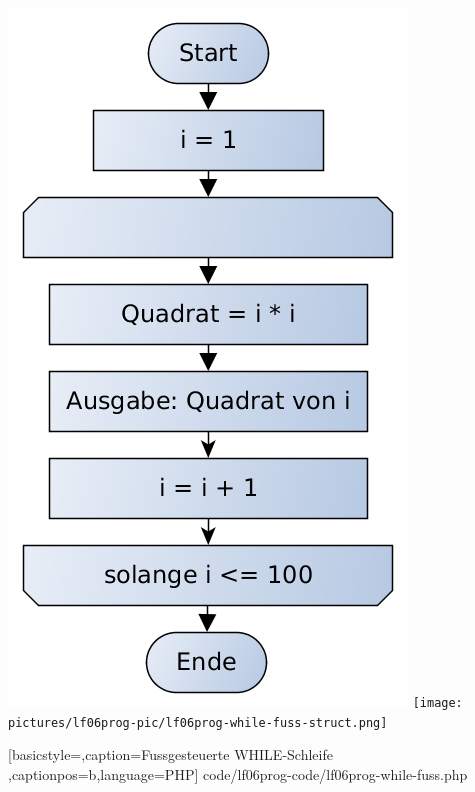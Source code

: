 \includegraphics[scale=0.4]{pictures/lf06prog-pic/lf06prog-while-fuss-pap.png}
\texttt{[image: pictures/lf06prog-pic/lf06prog-while-fuss-struct.png]}


	[basicstyle=\small,caption={Fussgesteuerte WHILE-Schleife}
	\label{lst:while-fuss},captionpos=b,language=PHP]
	{code/lf06prog-code/lf06prog-while-fuss.php}

